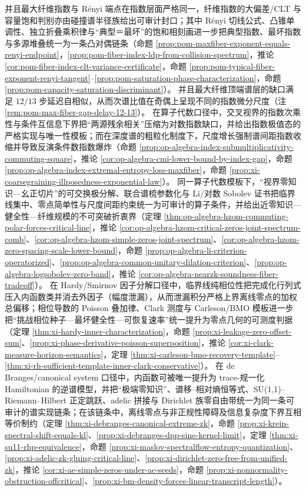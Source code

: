 并且最大纤维指数与 Rényi 端点在指数层面严格同一，纤维指数的大偏差/CLT 与容量饱和判别亦由碰撞谱半径族给出可审计封口；其中 Rényi 切线公式、凸锥单调性、独立折叠乘积律与“典型＝最坏”的饱和相刻画进一步把典型指数、最坏指数与多源堆叠统一为一条凸对偶链条（命题 \ref{prop:pom-maxfiber-exponent-equals-renyi-endpoint}，\ref{prop:pom-fiber-index-ldp-from-collision-spectrum}，推论 \ref{cor:pom-fiber-index-clt-variance-certificate}，命题 \ref{prop:pom-typical-fiber-exponent-renyi-tangent}--\ref{prop:pom-saturation-phase-characterization}，命题 \ref{prop:pom-capacity-saturation-discriminant}）。
并且最大纤维顶端谱层的缺口满足 \(12/13\) 步延迟自相似，从而次谱比值在奇偶上呈现不同的指数微分尺度（注 \ref{rem:pom-max-fiber-gap-delay-12-13}）。
在算子代数口径中，交叉视界的指数次乘性与条件互信息下界把“两源残余相关”压缩为对数指数缺口，并给出指数极值态的严格实现与唯一性模板；而在深度谱的粗粒化制度下，尺度增长强制谱间距指数收缩并导致反演条件数指数爆炸（命题 \ref{prop:op-algebra-index-submultiplicativity-commuting-square}，推论 \ref{cor:op-algebra-cmi-lower-bound-by-index-gap}，命题 \ref{prop:op-algebra-index-extremal-entropy-loss-maxfiber}，命题 \ref{prop:xi-coarsegraining-illposedness-exponential-law}）。
同一算子代数模板下，“视界零知识—幺正切片”的可交换极分解、联合谱梳参数化与 Li/对数 Sobolev 证书把临界线集中、零点简单性与尺度间距约束统一为可审计的算子条件，并给出近零知识—健全性—纤维规模的不可突破折衷界（定理 \ref{thm:op-algebra-hzom-commuting-polar-forces-critical-line}，推论 \ref{cor:op-algebra-hzom-critical-zeros-joint-spectrum-comb}、\ref{cor:op-algebra-hzom-simple-zeros-joint-spectrum}、\ref{cor:op-algebra-hzom-zero-spacing-scale-lower-bound}，命题 \ref{prop:op-algebra-li-criterion-operatorized}、\ref{prop:op-algebra-common-unitary-dilation-criterion}、\ref{prop:op-algebra-logsobolev-zero-band}，推论 \ref{cor:op-algebra-nearzk-soundness-fiber-tradeoff}）。
在 Hardy/Smirnov 因子分解口径中，临界线纯相位性把完成化行列式压入内函数类并消去外因子（幅度泄漏），从而泄漏积分严格上界离线零点的加权总偏移；相位导数的 Poisson 叠加律、Clark 测度与 Carleson/BMO 模板进一步把“挑战相位种子—最坏健全性—可恢复速率”统一提升为零点几何的可测度判据（定理 \ref{thm:xi-hardy-inner-characterization}，命题 \ref{prop:xi-leakage-zero-offset-sum}、\ref{prop:xi-phase-derivative-poisson-superposition}，推论 \ref{cor:xi-clark-measure-horizon-semantics}，定理 \ref{thm:xi-carleson-bmo-recovery-template}--\ref{thm:xi-rh-sufficient-template-inner-clark-conservative}）。
在 de Branges/canonical system 口径中，内函数可被唯一提升为 trace-规一化 Hamiltonian 的逆谱模型，并把“极端零知识”、谱移–相对熵恒等式、SU(1,1)–Riemann--Hilbert 正定跳跃、adelic 拼接与 Dirichlet 族零自由带统一为同一条可审计的谱实现链条；在该链条中，离线零点与非正规性障碍及信息复杂度下界互相等价制约（定理 \ref{thm:xi-debranges-canonical-extreme-zk}，命题 \ref{prop:xi-krein-spectral-shift-equals-kl}、\ref{prop:xi-debranges-dpp-sine-kernel-limit}，定理 \ref{thm:xi-su11-rhp-equivalence}，命题 \ref{prop:xi-maslov-spectralflow-entropy-quantization}、\ref{prop:xi-adelic-zk-gluing-critical-line}、\ref{prop:xi-dirichlet-zero-free-from-unified-zk}，推论 \ref{cor:xi-ae-simple-zeros-under-ac-seeds}，命题 \ref{prop:xi-nonnormality-obstruction-offcritical}、\ref{prop:xi-bm-density-forces-linear-transcript-length}）。


